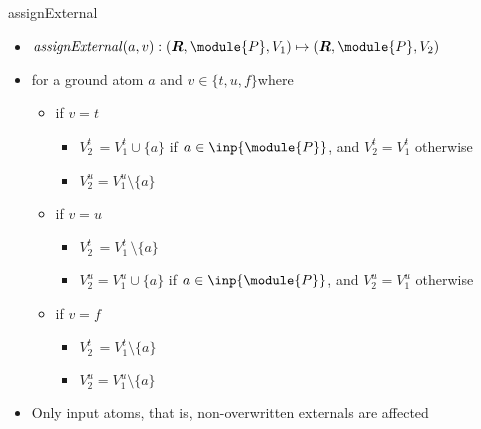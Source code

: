 \begin{frame}{assignExternal}
  \begin{itemize}
  \item $\mathit{assignExternal}(a,v): ( \boldsymbol{R},\module{P},V_1 )\mapsto(\boldsymbol{R},\module{P},V_2 )$
    \smallskip
  \item [] for a ground atom $a$ and $v\in\{t,u,f\}$\pause[2] where
    \medskip
    \begin{itemize}\normalsize
    \item if $v=t$
      \begin{itemize}\normalsize
      \item $V_2^t\,=V_1^t\cup\{a\}$ if $a\in\inp{\module{P}}$, and $V_2^t=V_1^t$ otherwise
      \item $V_2^u  =V_1^u\setminus\{a\}$
      \end{itemize}
    \item if $v=u$
      \begin{itemize}\normalsize
      \item $V_2^t\,=V_1^t\,\setminus\{a\}$
      \item $V_2^u  =V_1^u\cup\{a\}$ if $a\in\inp{\module{P}}$, and $V_2^u=V_1^u$ otherwise
      \end{itemize}
    \item if $v=f$
      \begin{itemize}\normalsize
      \item $V_2^t\,=V_1^t\setminus\{a\}$
      \item $V_2^u  =V_1^u\setminus\{a\}$
      \end{itemize}
    \end{itemize}
    \smallskip
  \item<3->  Only input atoms, that is, non-overwritten externals are affected
  \end{itemize}
\end{frame}
